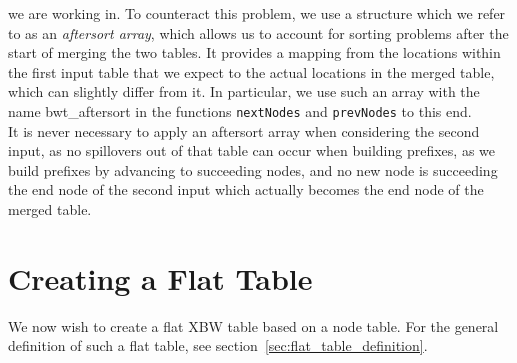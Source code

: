 \documentclass[a4paper,12pt,twoside,BCOR=10mm]{scrbook}
\begin{document}
we are working in.
To counteract this problem, we use a structure which we refer to as an \textit{aftersort array},
which allows us to account for sorting problems after the start of merging the two tables.
It provides a mapping from the locations within the first input table that we expect
to the actual locations in the merged table, which can slightly differ from it.
In particular, we use such an array with the name bwt\_aftersort in
the functions \texttt{nextNodes} and \texttt{prevNodes} to this end. \\
It is never necessary to apply an aftersort array when considering the second input,
as no spillovers out of that table can occur when building prefixes, as we build
prefixes by advancing to succeeding nodes, and no new node is succeeding the end node
of the second input which actually becomes the end node of the merged table.

\section{Creating a Flat Table}
%

We now wish to create a flat XBW table based on a node table.
For the general definition of such a flat table, see section~\ref{sec:flat_table_definition}.
\end{document}
